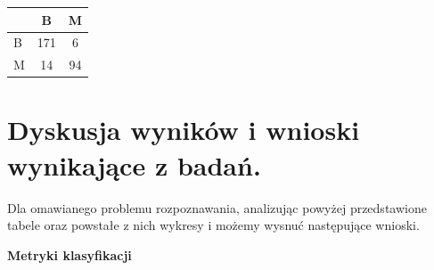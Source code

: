 \documentclass[12pt]{article}
\begin{document}
\begin{table}[H]
\begin{center}
\label{balanced_9-NN_euklides_norm} 
\begin{LARGE}
\begin{tabular}{l|c|c|}
\cline{2-3}
                        & B & M \\ \hline
\multicolumn{1}{|l|}{B} & 171 & 6 \\ \hline
\multicolumn{1}{|l|}{M} & 14 & 94 \\ \hline
\end{tabular}
\end{LARGE}
\end{center}
\end{table}



\newpage
\section{Dyskusja wyników i wnioski wynikające z badań.}

\indent Dla omawianego problemu rozpoznawania, analizując powyżej przedstawione tabele oraz powstałe z nich wykresy i możemy wysnuć następujące wnioski.\\

\centerline{\textbf{Metryki klasyfikacji }}
\end{document}
